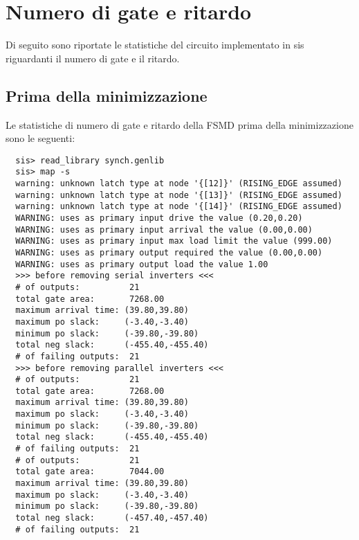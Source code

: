 \documentclass[a4paper]{article}
\begin{document}
\section{Numero di gate e ritardo}
Di seguito sono riportate le statistiche del circuito implementato in sis riguardanti il numero di gate e il ritardo.

\subsection{Prima della minimizzazione}
Le statistiche di numero di gate e ritardo della FSMD prima della minimizzazione sono le seguenti:
\vspace{1em}
\begin{lstlisting}
  sis> read_library synch.genlib
  sis> map -s
  warning: unknown latch type at node '{[12]}' (RISING_EDGE assumed)
  warning: unknown latch type at node '{[13]}' (RISING_EDGE assumed)
  warning: unknown latch type at node '{[14]}' (RISING_EDGE assumed)
  WARNING: uses as primary input drive the value (0.20,0.20)
  WARNING: uses as primary input arrival the value (0.00,0.00)
  WARNING: uses as primary input max load limit the value (999.00)
  WARNING: uses as primary output required the value (0.00,0.00)
  WARNING: uses as primary output load the value 1.00
  >>> before removing serial inverters <<<
  # of outputs:          21
  total gate area:       7268.00
  maximum arrival time: (39.80,39.80)
  maximum po slack:     (-3.40,-3.40)
  minimum po slack:     (-39.80,-39.80)
  total neg slack:      (-455.40,-455.40)
  # of failing outputs:  21
  >>> before removing parallel inverters <<<
  # of outputs:          21
  total gate area:       7268.00
  maximum arrival time: (39.80,39.80)
  maximum po slack:     (-3.40,-3.40)
  minimum po slack:     (-39.80,-39.80)
  total neg slack:      (-455.40,-455.40)
  # of failing outputs:  21
  # of outputs:          21
  total gate area:       7044.00
  maximum arrival time: (39.80,39.80)
  maximum po slack:     (-3.40,-3.40)
  minimum po slack:     (-39.80,-39.80)
  total neg slack:      (-457.40,-457.40)
  # of failing outputs:  21
\end{lstlisting}
\end{document}
